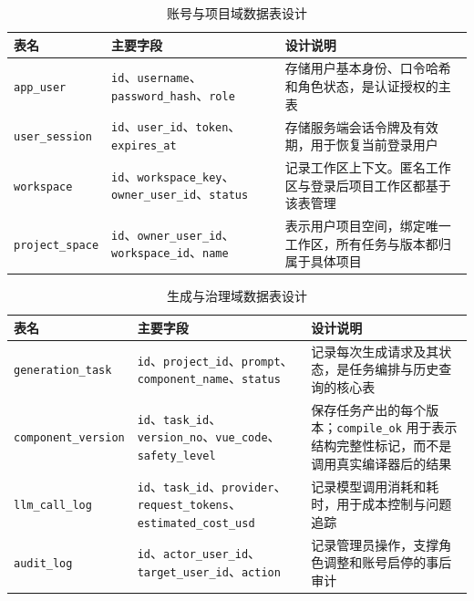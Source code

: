 \begin{table}[!htbp]
\centering
\caption{账号与项目域数据表设计}
\label{tab:chapter4-db-user-project}
\small
\begin{tabular}{@{}p{}p{}p{}@{}}
\toprule
表名 & 主要字段 & 设计说明 \\
\midrule
\texttt{app\_user} & \texttt{id}、\texttt{username}、\texttt{password\_hash}、\texttt{role} & 存储用户基本身份、口令哈希和角色状态，是认证授权的主表 \\
\texttt{user\_session} & \texttt{id}、\texttt{user\_id}、\texttt{token}、\texttt{expires\_at} & 存储服务端会话令牌及有效期，用于恢复当前登录用户 \\
\texttt{workspace} & \texttt{id}、\texttt{workspace\_key}、\texttt{owner\_user\_id}、\texttt{status} & 记录工作区上下文。匿名工作区与登录后项目工作区都基于该表管理 \\
\texttt{project\_space} & \texttt{id}、\texttt{owner\_user\_id}、\texttt{workspace\_id}、\texttt{name} & 表示用户项目空间，绑定唯一工作区，所有任务与版本都归属于具体项目 \\
\bottomrule
\end{tabular}
\end{table}

\begin{table}[!htbp]
\centering
\caption{生成与治理域数据表设计}
\label{tab:chapter4-db-generation}
\small
\begin{tabular}{@{}p{}p{}p{}@{}}
\toprule
表名 & 主要字段 & 设计说明 \\
\midrule
\texttt{generation\_task} & \texttt{id}、\texttt{project\_id}、\texttt{prompt}、\texttt{component\_name}、\texttt{status} & 记录每次生成请求及其状态，是任务编排与历史查询的核心表 \\
\texttt{component\_version} & \texttt{id}、\texttt{task\_id}、\texttt{version\_no}、\texttt{vue\_code}、\texttt{safety\_level} & 保存任务产出的每个版本；\texttt{compile\_ok} 用于表示结构完整性标记，而不是调用真实编译器后的结果 \\
\texttt{llm\_call\_log} & \texttt{id}、\texttt{task\_id}、\texttt{provider}、\texttt{request\_tokens}、\texttt{estimated\_cost\_usd} & 记录模型调用消耗和耗时，用于成本控制与问题追踪 \\
\texttt{audit\_log} & \texttt{id}、\texttt{actor\_user\_id}、\texttt{target\_user\_id}、\texttt{action} & 记录管理员操作，支撑角色调整和账号启停的事后审计 \\
\bottomrule
\end{tabular}
\end{table}

